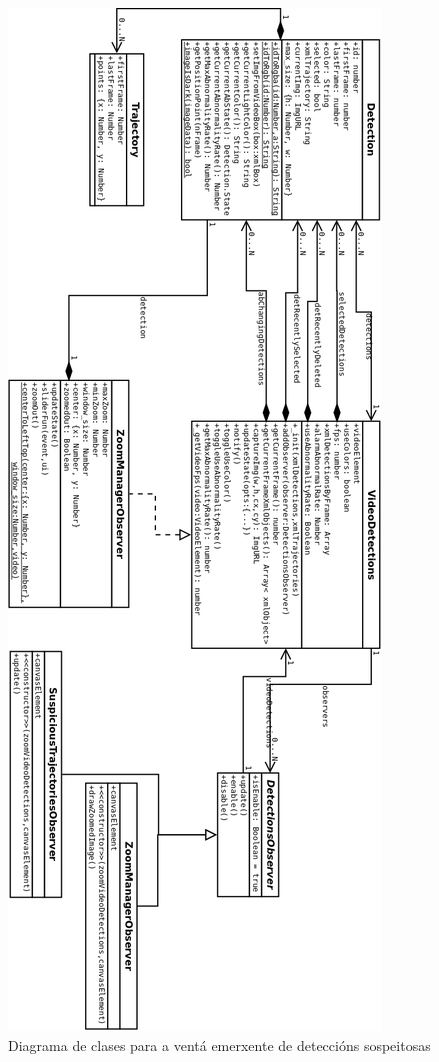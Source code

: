     \begin{figure}[htp]
    \begin{center}
        \includegraphics[scale=0.4]{figures/SuspiciousPopupJS.png}
        \caption{Diagrama de clases para a ventá emerxente de deteccións sospeitosas}
    \label{fig:SuspiciousPopupJS}
    \end{center}
    \end{figure} 
    

